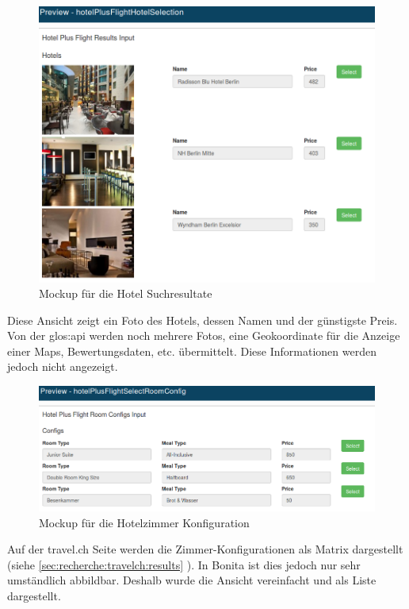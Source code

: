 \begin{figure}[H]
	\centering
	\includegraphics[width=1\textwidth]{images/forms-select-hotel.png}
	\caption{Mockup für die Hotel Suchresultate}
	\label{fig:konzept:mockups:selecthotel}
\end{figure}
Diese Ansicht zeigt ein Foto des Hotels, dessen Namen und der günstigste Preis. Von der \Gls{glos:api} werden noch mehrere Fotos, eine Geokoordinate für die Anzeige einer Maps, Bewertungsdaten, etc. übermittelt. Diese Informationen werden jedoch nicht angezeigt.

\begin{figure}[H]
	\centering
	\includegraphics[width=1\textwidth]{images/forms-select-roomconfig.png}
	\caption{Mockup für die Hotelzimmer Konfiguration}
	\label{fig:konzept:mockups:selectroomconfig}
\end{figure}
Auf der travel.ch Seite werden die Zimmer-Konfigurationen als Matrix dargestellt (siehe \cref{sec:recherche:travelch:results} ). In Bonita ist dies jedoch nur sehr umständlich abbildbar. Deshalb wurde die Ansicht vereinfacht und als Liste dargestellt.

